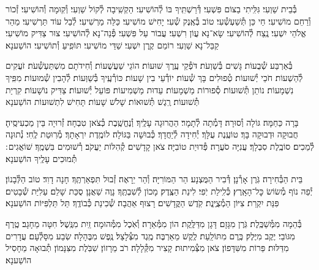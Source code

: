 \documentclass[twoside, openany, parskip=half, 11pt]{book}
\begin{document}
בְּ֯בֵית שַׁוְעִי׃ גִּלִּֽיתִי בַצּוֹם פִּשְׁעִי׃ דְּ֯רַשְׁתִּֽיךָ בּוֹ לְ֯הוֹשִׁיעִי׃ הַקְשִֽׁיבָה לְ֯קוֹל שַׁוְעִי׃ וְ֯קֽוּמָה וְ֯הוֹשִׁיעִי׃ זְ֯כוֹר וְ֯רַחֵם מוֹשִׁיעִי׃ חַי כֵּן תְּ֯שַׁעְשְׁ֯עִי׃ טוֹב בְּ֯אֶֽנֶק שְׁ֯עִי׃ יָחִישׁ מוֹשִׁיעִי׃ כַּלֵּה מַרְשִׁיעִי׃ לְ֯בַל עוֹד תַּרְשִׁיעִי׃ מַהֵר אֱלֹהֵי יִשְׁעִי׃ נֶֽצַח לְ֯הוֹשִׁיעִי׃ שָׂא־נָא עֲוֹן רִשְׁעִי׃ עֲבוֹר עַל פִּשְׁעִי׃ פְּ֯נֵה־נָא לְ֯הוֹשִׁיעִי׃ צוּר צַדִּיק מוֹשִׁיעִי׃ קַבֵּל־נָא שַׁוְעִי׃ רוֹמֵם קֶֽרֶן יִשְׁעִי׃
שַׁדַּי מוֹשִׁיעִי׃ תּוֹפִֽיעַ וְ֯תוֹשִׁיעִי׃ הוֹשַׁענָא׃


בְּ֯אַרְבַּע שְׁ֯בֻעוֹת׃ גָּשִׁים בְּ֯שַׁוְעֹת׃ דֹּפְ֯קֵי עֶֽרֶךְ שׁוּעוֹת׃ הוֹגֵי שַׁעֲשֻׁעוֹת׃ וְ֯חִידֹתָם מִשְׁתַּעְשְׁ֯עֹת׃ זֹעֲקִים לְ֯הַשְׁעוֹת׃ חֹכֵי יְ֯שׁוּעוֹת׃ טְ֯פוּלִים בָּךְ שְׁ֯עוֹת׃ יוֹדְ֯עֵי בִין שָׁעוֹת׃ כּוֹרְ֯עֶֽיךָ בְּ֯שַׁוְּעוֹת׃ לְ֯הָבִין שְׁ֯מוּעוֹת׃ מִפִּֽיךָ נִשְׁמָעוֹת׃ נוֹתֵן תְּ֯שׁוּעוֹת׃ סְ֯פוּרוֹת מַשְׁמָעוֹת׃ עֵדוּת מַשְׁמִיעוֹת׃ פּוֹעֵל יְ֯שׁוּעוֹת׃ צַדִּיק נוֹשָׁעוֹת׃ קִרְיַת תְּ֯שׁוּעוֹת׃ רֶֽגֶשׁ תְּ֯שׁוּאוֹת׃
שָׁלֹשׁ שָׁעוֹת׃
תָּחִישׁ לִתְשׁוּעוֹת הוֹשַׁענָא



בָּרָה כַּחַמָּה׃ גּוֹלָה וְ֯סוּרָה׃ דָּמְ֯תָה לְ֯תָמָר׃ הַהֲרוּגָה עָלֶֽיךָ׃ וְ֯נֶחֱשֶֽׁבֶת כְּ֯צֹאן טִבְחָה׃ זְ֯רוּיָה בֵּין מַכְעִיסֶֽיהָ׃ חֲבוּקָה וּדְבוּקָה בָּךְ׃ טוֹעֶֽנֶת עֻלָּךְ׃ יְ֯חִידָה לְ֯יַחֲדָךְ׃ כְּ֯בוּשָׁה בַּגּוֹלָה׃ לוֹמֶֽדֶת יִרְאָתָךְ׃ מְ֯רֽוּטַת לֶֽחִי׃ נְ֯תוּנָה לְ֯מַכִים׃ סוֹבֶֽלֶת סִבְלָךְ׃ עֲנִיָּה סֹעֲרָה׃ פְּ֯דוּיַת טוֹבִיָּה׃ צֹאן קָדָשִׁים׃ קְ֯הִלּוֹת יַעֲקֹב׃ רְ֯שׁוּמִים בִּשְׁמֶֽךָ׃
שׁוֹאֲגִים ׃
תְּ֯מוּכִים עָלֶֽיךָ הוֹשַׁענָא׃


בֵּית הַבְּ֯חִירָה׃ גֹּֽרֶן אָרְ֯נָן׃ דְּ֯בִיר הַמֻּצְנָע׃ הַר הַמּוֹרִיָּה׃ וְ֯הַר יֵרָאֶה׃ זְ֯בוּל תִּפְאַרְתֶּֽךָ׃ חָנָה דָוִד׃ טוֹב הַלְּ֯בָנוֹן׃ יְ֯פֵה נוֹף מְ֯שׂוֹשׂ כׇּל־הָאָֽרֶץ׃ כְּ֯לִֽילַת יֹֽפִי׃ לִינַת הַצֶּֽדֶק׃ מָכוֹן לְ֯שִׁבְתֶּֽךָ׃ נָוֶה שַׁאֲנָן׃ סֻכַּת שָׁלֵם׃ עַלִיַּת שְׁ֯בָטִים׃ פִּנַּת יִקְרַת׃ צִיּוֹן הַמְ֯צֻיֶּֽנֶת׃ קֹֽדֶשׁ הַקֳּדָשִׁים׃ רָצוּף אַהֲבָה׃
שְׁ֯כִינַת כְּ֯בוֹדֶֽךָ׃
תֵּל תַּלְפִּיּוֹת הוֹשַׁענָא׃


בְּ֯הֵמָה מִמְּ֯שַׁכֶּֽלֶת׃ גֹּֽרֶן מִגָּזָם׃ דָּגָן מִדַּלֶּֽקֶת׃ הוֹן מִמְּ֯אֵרָה׃ וְ֯אֹֽכֶל מִמְּ֯הוּמָה׃ זַֽיִת מִנֶּֽשֶׁל׃ חִטָּה מֵחָגָב׃ טֶֽרֶף מִגּוֹבַי׃ יֶקֶב מִיֶּלֶק׃ כֶּֽרֶם מִתּוֹלַֽעַת׃ לֶֽקֶשׁ מֵאַרְבֶּה׃ מֶֽגֶד מִצְּ֯לָצַל׃ נֶֽפֶשׁ מִבֶּהָלָה׃ שֽׂבַע מִסָּלְ֯עָם׃ עֲדָרִים מִדַּלּוּת׃ פֵּרוֹת מִשִּׁדָּפוֹן׃ צֹאן מִצְּ֯מִיתוּת׃ קָצִיר מִקְּ֯לָלָה׃ רֹב מֵרָזוֹן׃
שִׁבֹּֽלֶת מִצִּנָּמוֹן׃
תְּ֯בוּאָה מֵחָסִיל הוֹשַׁענָא׃
\end{document}
